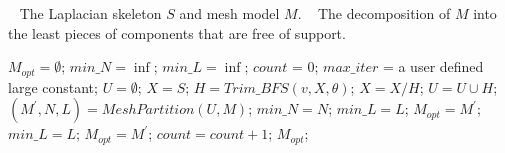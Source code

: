 \begin{algorithm}
\caption{$Skeleton\_Mesh\_Decomposition(S, M)$}
\label{alg:Framwork}
\begin{algorithmic}[1]
\REQUIRE~
The Laplacian skeleton $S$ and mesh model $M$.
\ENSURE~
The decomposition of $M$ into the least pieces of components that are free of support.

\STATE $M_{opt} = \emptyset$; $min\_N = \inf$; $min\_L = \inf$; $count$ = 0; $max\_iter$ = a user defined large constant;
\STATE  $U= \emptyset$;
\STATE  $X= S$;
\STATE $H = Trim\_BFS(v, X, \theta)$;
\STATE $X = X / H$;
\STATE $U = U \cup H$;
\ENDWHILE
\STATE $(M^{'}, N, L) = MeshPartition(U , M)$;
\STATE  $min\_N = N$;
\STATE  $min\_L = L$;
\STATE  $M_{opt} = M^{'}$;
\STATE  $min\_L = L$;
\STATE  $M_{opt} = M^{'}$;
\ENDIF
\STATE $count =count + 1$;
\ENDWHILE
\RETURN  $M_{opt}$;
\label{code:fram:select} \\
\end{algorithmic}
\end{algorithm}

